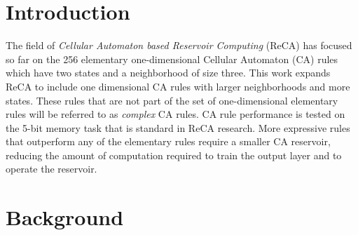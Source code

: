 \documentclass{elsarticle}
\begin{document}
\begin{multicols}{2}
\section{Introduction}\label{introduction}
The field of \textit{Cellular Automaton based Reservoir Computing} (ReCA) has 
focused so far on the 256 elementary one-dimensional Cellular Automaton (CA) 
    rules which have two states and a neighborhood of size three. This work 
    expands ReCA to include one dimensional CA rules with larger neighborhoods 
    and more states.
    These rules that are not part of the set of one-dimensional elementary 
    rules will be referred to as \textit{complex} CA rules.  CA rule 
    performance is tested on the 5-bit memory task that is standard in ReCA 
    research. More expressive rules that outperform any of the elementary rules 
    require a smaller CA reservoir, reducing the amount of computation required 
    to train the output layer and to operate the reservoir.\par

    \section{Background}\label{background}

\end{multicols}
\end{document}

